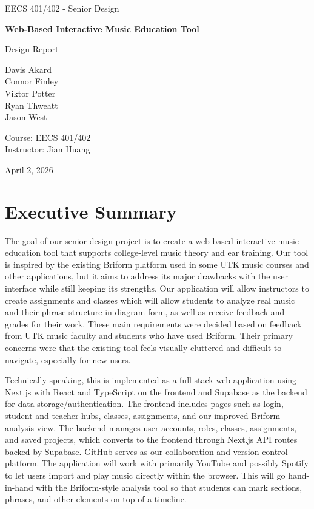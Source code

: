 \documentclass[12pt, letterpaper]{article}
\begin{document}
\begin{titlepage}
    \centering
    {\Large EECS 401/402 - Senior Design \par}
    \vspace{1cm}
    {\huge\bfseries Web-Based Interactive Music Education Tool\par}
    \vspace{1cm}
    {\Large Design Report\par}
    \vfill
    {\large
    Davis Akard \\
    Connor Finley \\
    Viktor Potter \\
    Ryan Thweatt \\
    Jason West\par}
    \vspace{1cm}
    {\large
    Course: EECS 401/402 \\
    Instructor: Jian Huang\par}
    \vfill
    {\large April 2, 2026 \par}
\end{titlepage}

\section*{Executive Summary}
The goal of our senior design project is to create a web-based interactive music education tool that supports college-level music theory and ear training. Our tool is inspired by the existing Briform platform used in some UTK music courses and other applications, but it aims to address its major drawbacks with the user interface while still keeping its strengths. Our application will allow instructors to create assignments and classes which will allow students to analyze real music and their phrase structure in diagram form, as well as receive feedback and grades for their work. These main requirements were decided based on feedback from UTK music faculty and students who have used Briform. Their primary concerns were that the existing tool feels visually cluttered and difficult to navigate, especially for new users.

Technically speaking, this is implemented as a full-stack web application using Next.js with React and TypeScript on the frontend and Supabase as the backend for data storage/authentication. The frontend includes pages such as login, student and teacher hubs, classes, assignments, and our improved Briform analysis view. The backend manages user accounts, roles, classes, assignments, and saved projects, which converts to the frontend through Next.js API routes backed by Supabase. GitHub serves as our collaboration and version control platform. The application will work with primarily YouTube and possibly Spotify to let users import and play music directly within the browser. This will go hand-in-hand with the Briform-style analysis tool so that students can mark sections, phrases, and other elements on top of a timeline.
\end{document}
